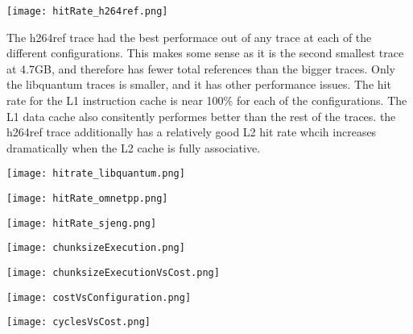 \documentclass[cacheSimReport.tex]{subfiles}
\begin{document}
\hspace{-.9cm}\texttt{[image: hitRate\_h264ref.png]}

The h264ref trace had the best performace out of any trace at each of the different configurations. This makes some sense as it is the second smallest trace at 4.7GB, and therefore has fewer total references than the bigger traces. Only the libquantum traces is smaller, and it has other performance issues. The hit rate for the L1 instruction cache is near 100\% for each of the configurations. The L1 data cache also consitently performes better than the rest of the traces. the h264ref trace additionally has a relatively good L2 hit rate whcih increases dramatically when the L2 cache is fully associative.

\hspace{-.9cm}\texttt{[image: hitrate\_libquantum.png]}

\hspace{-.9cm}\texttt{[image: hitRate\_omnetpp.png]}

\hspace{-.9cm}\texttt{[image: hitRate\_sjeng.png]}

\hspace{-.9cm}\texttt{[image: chunksizeExecution.png]}

\hspace{-.9cm}\texttt{[image: chunksizeExecutionVsCost.png]}

\hspace{-.9cm}\texttt{[image: costVsConfiguration.png]}

\hspace{.9cm}\texttt{[image: cyclesVsCost.png]}
\end{document}
